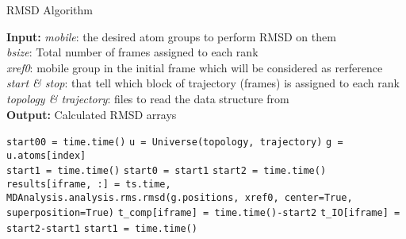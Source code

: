 \begin{algorithm}[ht]
	\scriptsize
    \caption{RMSD Algorithm}
    \label{alg:RMSD}
    \hspace*{\algorithmicindent} \textbf{Input:} \emph{mobile}: the desired atom groups to perform RMSD on them \\ 
    \hspace*{\algorithmicindent} \emph{bsize}: Total number of frames assigned to each rank \\
    \hspace*{\algorithmicindent} \emph{xref0}: mobile group in the initial frame which will be considered as rerference \\
    \hspace*{\algorithmicindent} \emph{start \& stop}: that tell which block of trajectory (frames) is assigned to each rank \\
    \hspace*{\algorithmicindent} \emph{topology \& trajectory}: files to read the data structure from \\
    \hspace*{\algorithmicindent} \textbf{Output:} Calculated RMSD arrays
    \begin{algorithmic}[1]
        \State \texttt{start00 = time.time()}
        \State \texttt{u = Universe(topology, trajectory)}
        \State \texttt{g = u.atoms[index]}
        \\
        \State \texttt{start1 = time.time()}
        \State \texttt{start0 = start1}
        \State \texttt{start2 = time.time()}
        \State \texttt{results[iframe, :] = ts.time, MDAnalysis.analysis.rms.rmsd(g.positions, xref0, center=True, superposition=True)}
        \State \texttt{t\_comp[iframe] = time.time()-start2}
        \State \texttt{t\_IO[iframe] = start2-start1}
        \State \texttt{start1 = time.time()}
        \EndFor
        

\end{algorithmic}
\end{algorithm}
